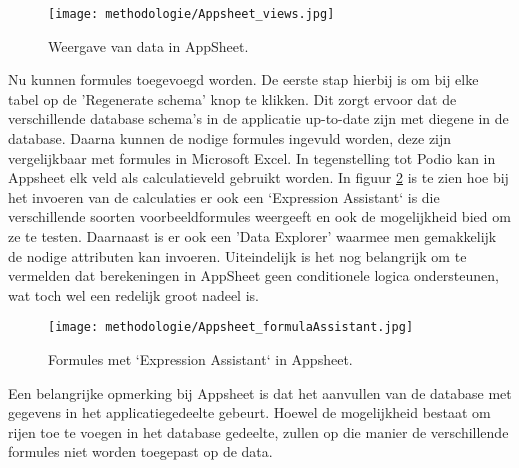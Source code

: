 \begin{figure}[ht]
    \centering
    \texttt{[image: methodologie/Appsheet\_views.jpg]}
    \caption{Weergave van data in AppSheet.}
    \label{fig:meth_appsheet_views}
\end{figure}

Nu kunnen formules toegevoegd worden. De eerste stap hierbij is om bij elke tabel op de 'Regenerate schema' knop te klikken. Dit zorgt ervoor dat de verschillende database schema's in de applicatie up-to-date zijn met diegene in de database. Daarna kunnen de nodige formules ingevuld worden, deze zijn vergelijkbaar met formules in Microsoft Excel. In tegenstelling tot Podio kan in Appsheet elk veld als calculatieveld gebruikt worden. In figuur \ref{fig:meth_appsheet_formulas} is te zien hoe bij het invoeren van de calculaties er ook een `Expression Assistant` is die verschillende soorten voorbeeldformules weergeeft en ook de mogelijkheid bied om ze te testen. Daarnaast is er ook een 'Data Explorer' waarmee men gemakkelijk de nodige attributen kan invoeren. Uiteindelijk is het nog belangrijk om te vermelden dat berekeningen in AppSheet geen conditionele logica ondersteunen, wat toch wel een redelijk groot nadeel is. \\

\begin{figure}[ht]
    \centering
    \texttt{[image: methodologie/Appsheet\_formulaAssistant.jpg]}
    \caption{Formules met `Expression Assistant` in Appsheet.}
    \label{fig:meth_appsheet_formulas}
\end{figure}

Een belangrijke opmerking bij Appsheet is dat het aanvullen van de database met gegevens in het applicatiegedeelte gebeurt. Hoewel de mogelijkheid bestaat om rijen toe te voegen in het database gedeelte, zullen op die manier de verschillende formules niet worden toegepast op de data. \\


